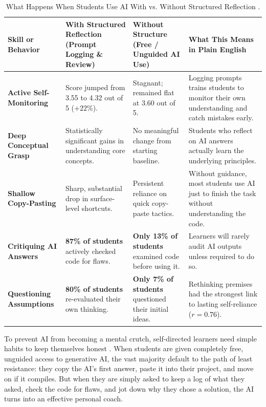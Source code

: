 \documentclass[11pt]{article}
\begin{document}
\begin{table}[htbp]
\centering
\small
\caption{What Happens When Students Use AI With vs. Without Structured Reflection \citep{song2026heutagogy}.}
\label{tab:hdl_data}
\begin{tabularx}{\linewidth}{p{2.6cm} >{\raggedright\arraybackslash}p{2.7cm} >{\raggedright\arraybackslash}p{2.7cm} >{\raggedright\arraybackslash}X}
\toprule
\textbf{Skill or Behavior} & \textbf{With Structured Reflection (Prompt Logging \& Review)} & \textbf{Without Structure (Free / Unguided AI Use)} & \textbf{What This Means in Plain English} \\
\midrule
\textbf{Active Self-Monitoring} & 
Score jumped from 3.55 to 4.32 out of 5 ($+22\%$). & 
Stagnant; remained flat at 3.60 out of 5. & 
Logging prompts trains students to monitor their own understanding and catch mistakes early. \\
\addlinespace
\textbf{Deep Conceptual Grasp} & 
Statistically significant gains in understanding core concepts. & 
No meaningful change from starting baseline. & 
Students who reflect on AI answers actually learn the underlying principles. \\
\addlinespace
\textbf{Shallow Copy-Pasting} & 
Sharp, substantial drop in surface-level shortcuts. & 
Persistent reliance on quick copy-paste tactics. & 
Without guidance, most students use AI just to finish the task without understanding the code. \\
\addlinespace
\textbf{Critiquing AI Answers} & 
\textbf{87\% of students} actively checked code for flaws. & 
\textbf{Only 13\% of students} examined code before using it. & 
Learners will rarely audit AI outputs unless required to do so. \\
\addlinespace
\textbf{Questioning Assumptions} & 
\textbf{80\% of students} re-evaluated their own thinking. & 
\textbf{Only 7\% of students} questioned their initial ideas. & 
Rethinking premises had the strongest link to lasting self-reliance ($r = 0.76$). \\
\bottomrule
\end{tabularx}
\end{table}

To prevent AI from becoming a mental crutch, self-directed learners need simple habits to keep themselves honest \citep{song2026heutagogy,zimmerman2002}. When students are given completely free, unguided access to generative AI, the vast majority default to the path of least resistance: they copy the AI's first answer, paste it into their project, and move on if it compiles. But when they are simply asked to keep a log of what they asked, check the code for flaws, and jot down why they chose a solution, the AI turns into an effective personal coach.
\end{document}

